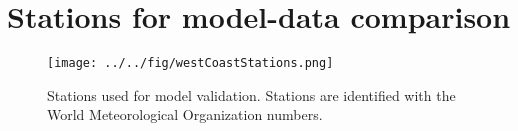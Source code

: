 \section{Stations for model-data comparison}\label{appendix:validation}

\begin{sidewaysfigure}
\texttt{[image: ../../fig/westCoastStations.png]}
  \caption{Stations used for model validation. Stations are identified with the World Meteorological Organization numbers.}
  \label{fig:buoyMap}
\end{sidewaysfigure}
